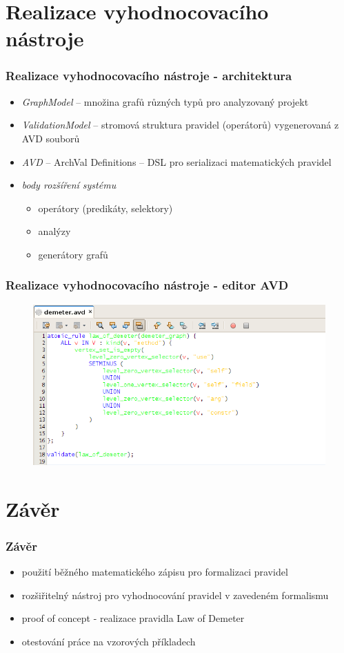 \documentclass{beamer}
\begin{document}
\section{Realizace vyhodnocovacího nástroje}
\begin{frame}
  \frametitle{Realizace vyhodnocovacího nástroje - architektura}
  \begin{itemize}
    \item \emph{GraphModel} -- množina grafů různých typů pro analyzovaný projekt
    \item \emph{ValidationModel} -- stromová struktura pravidel (operátorů) vygenerovaná z AVD souborů
    \item \emph{AVD} -- ArchVal Definitions -- DSL pro serializaci matematických pravidel
    \item \emph{body rozšíření systému}
    \begin{itemize}
      \item operátory (predikáty, selektory)
      \item analýzy
      \item generátory grafů
    \end{itemize}
  \end{itemize}
\end{frame}

\begin{frame}
  \frametitle{Realizace vyhodnocovacího nástroje - editor AVD}
    \begin{figure}[h!]
      \centering
      \includegraphics[width=1.0\textwidth]{./figures/archval.png}
    \end{figure}
\end{frame}

\section{Závěr}
\begin{frame}
  \frametitle{Závěr}
  \begin{itemize}
  \item použití běžného matematického zápisu pro formalizaci pravidel
  \item rozšiřitelný nástroj pro vyhodnocování pravidel v zavedeném formalismu
  \item proof of concept - realizace pravidla Law of Demeter
  \item otestování práce na vzorových příkladech
  \end{itemize}
\end{frame}
\end{document}
